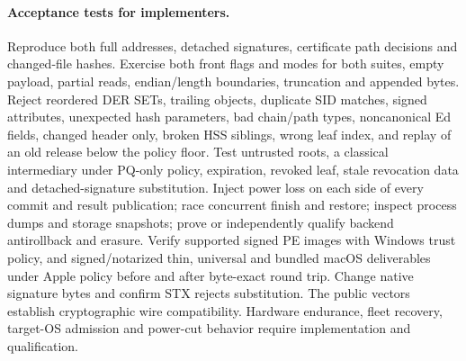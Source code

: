 \documentclass[10pt,twocolumn,letterpaper]{article}
\begin{document}
\paragraph{Acceptance tests for implementers.}
Reproduce both full addresses, detached signatures, certificate path decisions and changed-file hashes. Exercise both front flags and modes for both suites, empty payload, partial reads, endian/length boundaries, truncation and appended bytes. Reject reordered DER SETs, trailing objects, duplicate SID matches, signed attributes, unexpected hash parameters, bad chain/path types, noncanonical Ed fields, changed header only, broken HSS siblings, wrong leaf index, and replay of an old release below the policy floor. Test untrusted roots, a classical intermediary under PQ-only policy, expiration, revoked leaf, stale revocation data and detached-signature substitution. Inject power loss on each side of every commit and result publication; race concurrent finish and restore; inspect process dumps and storage snapshots; prove or independently qualify backend antirollback and erasure. Verify supported signed PE images with Windows trust policy, and signed/notarized thin, universal and bundled macOS deliverables under Apple policy before and after byte-exact round trip. Change native signature bytes and confirm STX rejects substitution. The public vectors establish cryptographic wire compatibility. Hardware endurance, fleet recovery, target-OS admission and power-cut behavior require implementation and qualification.
\end{document}
